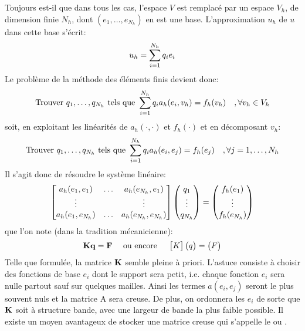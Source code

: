 \medskip
Toujours est-il que dans tous les cas, l'espace $V$ est remplacé par un espace $V_h$, de dimension
finie $N_h$, dont $(e_1,\ldots, e_{N_h})$ en est une base.
L'approximation $u_h$ de $u$ dans cette base s'écrit:
\begin{equation}
u_h=\displaystyle\sum_{i=1}^{N_h} q_i e_i
\end{equation}
\medskip
Le problème de la méthode des éléments finis devient donc:
\begin{equation}
\text{Trouver } q_1,\ldots, q_{N_h} \text{ tels que }
\displaystyle\sum_{i=1}^{N_h} q_i a_h(e_i,v_h) = f_h(v_h) \quad , \forall v_h\in V_h
\end{equation}
soit, en exploitant les linéarités de $a_h(\cdot,\cdot)$ et $f_h(\cdot)$ et en décomposant $v_h$:
\begin{equation}\label{Eq-Ph}
\text{Trouver } q_1,\ldots, q_{N_h} \text{ tels que }
\displaystyle\sum_{i=1}^{N_h} q_i a_h(e_i,e_j) = f_h(e_j) \quad ,\forall j=1,\ldots, N_h
\end{equation}
\medskip
Il s'agit donc de résoudre le système linéaire:
\begin{equation}
\MM*{%
a_h(e_1,e_1) & \dots & a_h(e_{N_h},e_1)\\
\vdots & & \vdots \\
a_h(e_1,e_{N_h}) & \dots & a_h(e_{N_h},e_{N_h})
}
\VV*{%
q_1\\
\vdots\\
q_{N_h}
}
=
\VV*{%
f_h(e_1)\\
$\vdots$\\
f_h(e_{N_h})
}
\end{equation}
que l'on note (dans la tradition mécanicienne):
\begin{equation}\mathbf{Kq=F} \quad \text{ ou encore } \quad \MM*{K}\VV*{q}=\VV*{F}
\end{equation}
\medskip
Telle que formulée, la matrice $\MM{K}$ semble pleine à priori.
L'astuce consiste à choisir des fonctions de base $e_i$ dont le support sera petit,
i.e. chaque fonction $e_i$ sera nulle partout sauf sur quelques mailles.
Ainsi les termes $a(e_i,e_j)$ seront le plus souvent nuls et la matrice A sera creuse.
De plus, on ordonnera les $e_i$ de sorte que $\MM{K}$ soit à structure bande, avec une
largeur de bande la plus faible possible.
Il existe un moyen avantageux de stocker une matrice creuse qui s'appelle le
 ou .


